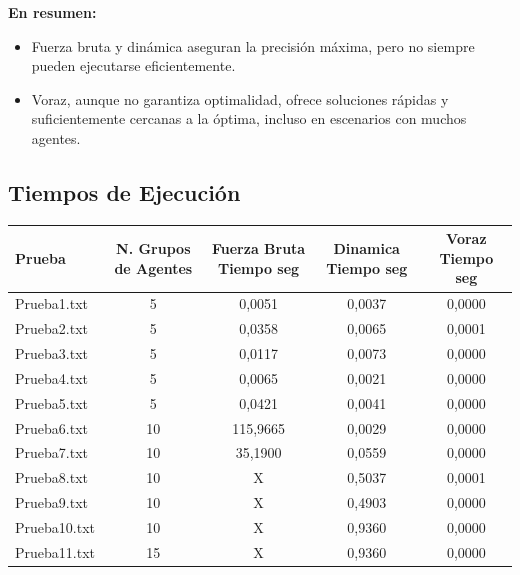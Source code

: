 \documentclass[11pt,letter]{article}
\begin{document}
    \textbf{En resumen:}
    \begin{itemize}
        \item Fuerza bruta y dinámica aseguran la precisión máxima, pero no siempre pueden ejecutarse eficientemente.
        \item Voraz, aunque no garantiza optimalidad, ofrece soluciones rápidas y suficientemente cercanas a la óptima, incluso en escenarios con muchos agentes.
    \end{itemize}

    \subsection{Tiempos de Ejecución}

\begin{table}[H]
\centering
\begin{adjustbox}{width=\textwidth}
\begin{tabular}{|l|c|c|c|c|}
\hline
Prueba & N. Grupos de Agentes & Fuerza Bruta Tiempo seg & Dinamica Tiempo seg & Voraz Tiempo seg \\
\hline
Prueba1.txt & 5 & \cellcolor{rosado}0,0051 & \cellcolor{verde}0,0037 & \cellcolor{verde}0,0000 \\
\hline
Prueba2.txt & 5 & \cellcolor{rosado}0,0358 & \cellcolor{verde}0,0065 & \cellcolor{verde}0,0001 \\
\hline
Prueba3.txt & 5 & \cellcolor{rosado}0,0117 & \cellcolor{verde}0,0073 & \cellcolor{verde}0,0000 \\
\hline
Prueba4.txt & 5 & \cellcolor{rosado}0,0065 & \cellcolor{verde}0,0021 & \cellcolor{verde}0,0000 \\
\hline
Prueba5.txt & 5 & \cellcolor{rosado}0,0421 & \cellcolor{verde}0,0041 & \cellcolor{verde}0,0000 \\
\hline
Prueba6.txt & 10 & \cellcolor{rosado}115,9665 & \cellcolor{verde}0,0029 & \cellcolor{verde}0,0000 \\
\hline
Prueba7.txt & 10 & \cellcolor{rosado}35,1900 & \cellcolor{verde}0,0559 & \cellcolor{verde}0,0000 \\
\hline
Prueba8.txt & 10 & \cellcolor{rosado}X & \cellcolor{verde}0,5037 & \cellcolor{verde}0,0001 \\
\hline
Prueba9.txt & 10 & \cellcolor{rosado}X & \cellcolor{verde}0,4903 & \cellcolor{verde}0,0000 \\
\hline
Prueba10.txt & 10 & \cellcolor{rosado}X & \cellcolor{verde}0,9360 & \cellcolor{verde}0,0000 \\
\hline
Prueba11.txt & 15 & \cellcolor{rosado}X & \cellcolor{verde}0,9360 & \cellcolor{verde}0,0000 \\

\end{tabular}
\end{adjustbox}
\end{table}
\end{document}

